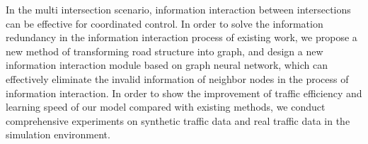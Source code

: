 \begin{abstractEn}
In the multi intersection scenario, information interaction between intersections can be effective for coordinated control. In order to solve the information redundancy in the information interaction process of existing work, we propose a new method of transforming road structure into graph, and design a new information interaction module based on graph neural network, which can effectively eliminate the invalid information of neighbor nodes in the process of information interaction. In order to show the improvement of traffic efficiency and learning speed of our model compared with existing methods, we conduct comprehensive experiments on synthetic traffic data and real traffic data in the simulation environment.

\end{abstractEn}



\usepackage{subfig}
\usepackage{rotating}
\usepackage[usenames,dvipsnames]{xcolor}
\usepackage{tikz}
\usepackage{pgfplots}
\pgfplotsset{compat=1.16}
\usepackage{ifthen}
\usepackage{longtable}
\usepackage{siunitx}
\usepackage{listings}
\usepackage{multirow}
\usepackage{pifont}

\usepackage{algorithm}  
\usepackage{algorithmicx}
\usepackage{algpseudocode}  
\usepackage{amsmath}  
\renewcommand{\algorithmicrequire}{\textbf{输入:}}
\renewcommand{\algorithmicensure}{\textbf{输出:}}


\makeatletter
\newenvironment{breakablealgorithm}
  {%
   \begin{center}
     \refstepcounter{algorithm}%
     \hrule height.8pt depth0pt \kern2pt%
     \renewcommand{\caption}[2][\relax]{%
       {\raggedright\textbf{\ALG@name~\thealgorithm} ##2\par}%
       \ifx\relax##1\relax %
         \addcontentsline{loa}{algorithm}{\protect\numberline{\thealgorithm}##2}%
       \else %
         \addcontentsline{loa}{algorithm}{\protect\numberline{\thealgorithm}##1}%
       \fi
       \kern2pt\hrule\kern2pt
     }
  }{%
     \kern2pt\hrule\relax%
   \end{center}
  }
\makeatother

